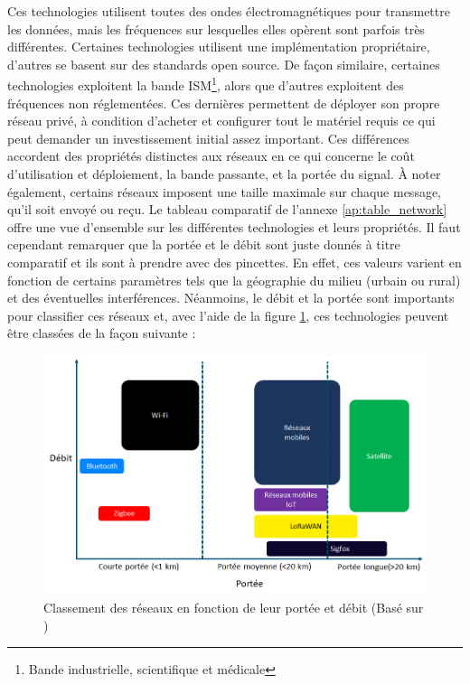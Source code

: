 \noindent
Ces technologies utilisent toutes des ondes électromagnétiques pour transmettre les données, mais les fréquences sur lesquelles elles opèrent sont parfois très différentes. Certaines technologies utilisent une implémentation propriétaire, d'autres se basent sur des standards open source. \cite{foubert_iot} De façon similaire, certaines technologies exploitent la bande ISM\footnote{Bande industrielle, scientifique et médicale}, alors que d'autres exploitent des fréquences non réglementées. Ces dernières permettent de déployer son propre réseau privé, à condition d'acheter et configurer tout le matériel requis ce qui peut demander un investissement initial assez important. Ces différences accordent des propriétés distinctes aux réseaux en ce qui concerne le coût d'utilisation et déploiement, la bande passante, et la portée du signal. À noter également, certains réseaux imposent une taille maximale sur chaque message, qu'il soit envoyé ou reçu. Le tableau comparatif de l'annexe \ref{ap:table_network} offre une vue d'ensemble sur les différentes technologies et leurs propriétés. Il faut cependant remarquer que la portée et le débit sont juste donnés à titre comparatif et ils sont à prendre avec des pincettes. En effet, ces valeurs varient en fonction de certains paramètres tels que la géographie du milieu (urbain ou rural) et des éventuelles interférences. Néanmoins, le débit et la portée sont importants pour classifier ces réseaux et, avec l'aide de la figure \ref{fig:range_iot}, ces technologies peuvent être classées de la façon suivante \cite{orange_iot} :


\begin{figure}
  \includegraphics[width=\textwidth]{img/state_of_the_art/range_iot.png}
  \caption{Classement des réseaux en fonction de leur portée et débit (Basé sur \cite{mekki2018overview})}
  \label{fig:range_iot}
\end{figure}

